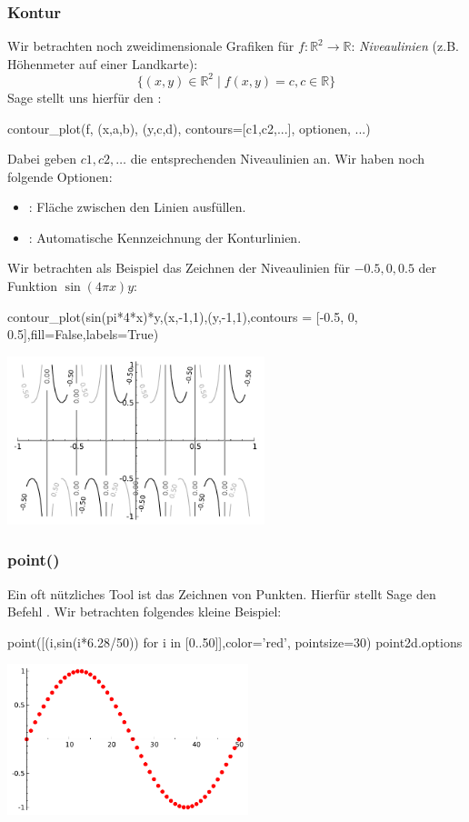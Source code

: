 \documentclass[fontsize=12pt,paper=a4,twoside,bibtotoc,idxtotoc,
liststotoc,pagesize,BCOR1.2cm,DIV15,chapterprefix,pagesize=pdftex]{scrbook}
\theoremstyle{plain}
\theoremstyle{definition}
\theoremstyle{remark}
\begin{document}
\subsubsection{Kontur}
Wir betrachten noch zweidimensionale Grafiken für $f:\mathbb{R}^2 \rightarrow \mathbb{R}$:
\emph{Niveaulinien} (z.B. Höhenmeter auf einer
Landkarte):
\[ 
\{(x,y) \in \mathbb{R}^2 \;|\; f(x,y)=c, c \in \mathbb{R}\}
\]
Sage stellt uns hierfür den :
\begin{sagein}
contour_plot(f, (x,a,b), (y,c,d), contours=[c1,c2,...], optionen, ...)
\end{sagein}
Dabei geben $c1,c2,\ldots$ die entsprechenden Niveaulinien an.
Wir haben noch folgende Optionen:
\begin{itemize}
 \item {}: Fläche zwischen den Linien ausfüllen.
 \item {}: Automatische Kennzeichnung der Konturlinien.
\end{itemize}
Wir betrachten als Beispiel das Zeichnen der Niveaulinien für $-0.5, 0, 0.5$ der Funktion $\sin(4\pi x)y$: 
\begin{sagein}
contour_plot(sin(pi*4*x)*y,(x,-1,1),(y,-1,1),contours = [-0.5, 0, 0.5],fill=False,labels=True)
\end{sagein}
\begin{center}
\includegraphics[width=7.5cm]{contour.pdf} 
\end{center}
\subsubsection{point()}
Ein oft nützliches Tool ist das Zeichnen von Punkten. Hierfür stellt Sage den Befehl {\color{blue} }. 
Wir betrachten folgendes kleine Beispiel:
\begin{sagein}
point([(i,sin(i*6.28/50)) for i in [0..50]],color='red', pointsize=30) 
point2d.options
\end{sagein}
\begin{center}
\includegraphics[width=7cm]{point2d.pdf} 
\end{center}
\end{document}
